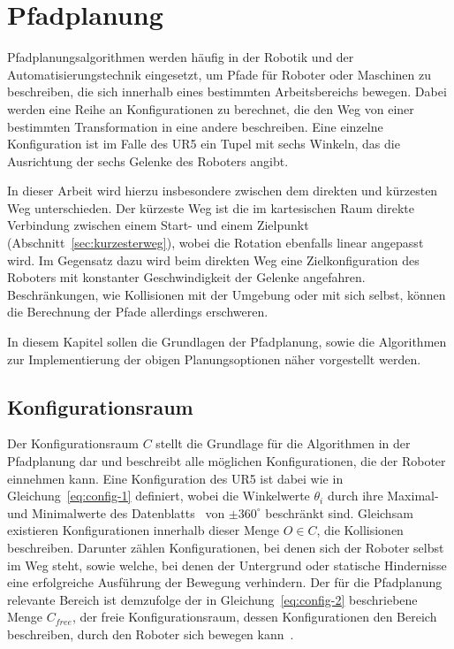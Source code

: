 \cleardoublepage


\chapter{Pfadplanung}\label{ch:pfadplanung}

Pfadplanungsalgorithmen werden häufig in der Robotik und der Automatisierungstechnik eingesetzt, um Pfade für Roboter oder Maschinen zu beschreiben, die sich innerhalb eines bestimmten Arbeitsbereichs bewegen.
Dabei werden eine Reihe an Konfigurationen zu berechnet, die den Weg von einer bestimmten Transformation in eine andere beschreiben.
Eine einzelne Konfiguration ist im Falle des UR5 ein Tupel mit sechs Winkeln, das die Ausrichtung der sechs Gelenke des Roboters angibt.

In dieser Arbeit wird hierzu insbesondere zwischen dem direkten und kürzesten Weg unterschieden.
Der kürzeste Weg ist die im kartesischen Raum direkte Verbindung zwischen einem Start- und einem Zielpunkt (Abschnitt~\ref{sec:kurzesterweg}), wobei die Rotation ebenfalls linear angepasst wird.
Im Gegensatz dazu wird beim direkten Weg eine Zielkonfiguration des Roboters mit konstanter Geschwindigkeit der Gelenke angefahren.
Beschränkungen, wie Kollisionen mit der Umgebung oder mit sich selbst, können die Berechnung der Pfade allerdings erschweren.

In diesem Kapitel sollen die Grundlagen der Pfadplanung, sowie die Algorithmen zur Implementierung der obigen Planungsoptionen näher vorgestellt werden.


\section{Konfigurationsraum}\label{sec:konfigurationsraum}

Der Konfigurationsraum $\mathit{C}$ stellt die Grundlage für die Algorithmen in der Pfadplanung dar und beschreibt alle möglichen Konfigurationen, die der Roboter einnehmen kann.
Eine Konfiguration des UR5 ist dabei wie in Gleichung~\ref{eq:config-1} definiert, wobei die Winkelwerte $\theta_i$ durch ihre Maximal- und Minimalwerte des Datenblatts~\cite{universalrobotsUR5TechnicalSpecifications} von $\pm 360^{\circ}$ beschränkt sind.
Gleichsam existieren Konfigurationen innerhalb dieser Menge $\mathit{O}\in\mathit{C}$, die Kollisionen beschreiben.
Darunter zählen Konfigurationen, bei denen sich der Roboter selbst im Weg steht, sowie welche, bei denen der Untergrund oder statische Hindernisse eine erfolgreiche Ausführung der Bewegung verhindern.
Der für die Pfadplanung relevante Bereich ist demzufolge der in Gleichung~\ref{eq:config-2} beschriebene Menge $\mathit{C}_{free}$, der freie Konfigurationsraum, dessen Konfigurationen den Bereich beschreiben, durch den Roboter sich bewegen kann~\cite[83f]{sicilianoRobotics2009}.

